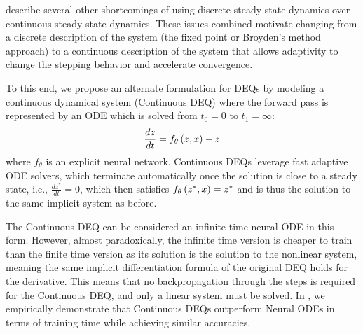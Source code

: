 \citet{rico1992discrete, bulsari1995neural} describe several other shortcomings of using discrete steady-state dynamics over continuous steady-state dynamics. These issues combined motivate changing from a discrete description of the system (the fixed point or Broyden's method approach) to a continuous description of the system that allows adaptivity to change the stepping behavior and accelerate convergence.

To this end, we propose an alternate formulation for DEQs by modeling a continuous dynamical system (Continuous DEQ) where the forward pass is represented by an ODE which is solved from $t_0 = 0$ to $t_1 = \infty$:
%
\begin{equation}
    \frac{dz}{dt} = f_\theta\left(z, x\right) - z
\end{equation}
%
where $f_\theta$ is an explicit neural network. Continuous DEQs leverage fast adaptive ODE solvers, which terminate automatically once the solution is close to a steady state, i.e., $\frac{dz^*}{dt} = 0$, which then satisfies $f_\theta\left(z^*, x\right) = z^*$ and is thus the solution to the same implicit system as before.

The Continuous DEQ can be considered an infinite-time neural ODE in this form. However, almost paradoxically, the infinite time version is cheaper to train than the finite time version as its solution is the solution to the nonlinear system, meaning the same implicit differentiation formula of the original DEQ holds for the derivative. This means that no backpropagation through the steps is required for the Continuous DEQ, and only a linear system must be solved. In , we empirically demonstrate that Continuous DEQs outperform Neural ODEs in terms of training time while achieving similar accuracies.



